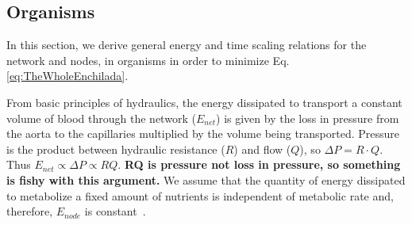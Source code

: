 \documentclass[12pt]{article}
\begin{document}


\subsection{Organisms}
\label{sec:organisms}

In this section, we derive general energy and time scaling relations 
for the network and nodes, in organisms in order to minimize Eq. \ref{eq:TheWholeEnchilada}.  

From basic principles of hydraulics, the energy dissipated to
transport a constant volume of blood through the network ($E_{net}$)
is given by the loss in pressure from the aorta to the capillaries
multiplied by the volume being transported.  Pressure is the product between
hydraulic resistance ($R$) and flow ($Q$), so $\Delta P = R·Q$.  Thus $E_{net}
\propto \Delta P \propto RQ$.
{\bf RQ is pressure not loss in pressure, so something is fishy with
  this argument.}
We assume that the quantity of energy dissipated to metabolize a fixed 
amount of nutrients is independent of metabolic rate and, therefore, 
$E_{node}$ is constant~\cite{west97}.   

\end{document}
